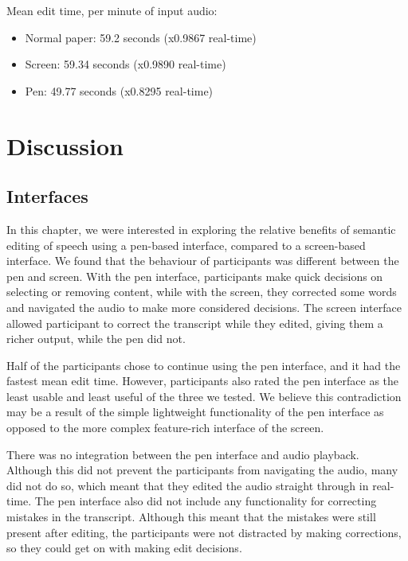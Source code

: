 Mean edit time, per minute of input audio:
\begin{itemize}
    \item Normal paper: 59.2 seconds (x0.9867 real-time)
    \item Screen: 59.34 seconds (x0.9890 real-time)
    \item Pen: 49.77 seconds (x0.8295 real-time)
\end{itemize}







\section{Discussion}\label{sec:paper-discussion}

\subsection{Interfaces}

In this chapter, we were interested in exploring the relative benefits of semantic editing of speech using a pen-based 
interface, compared to a screen-based interface.
We found that the behaviour of participants was different between the pen and screen. With the pen interface,
participants make
quick decisions on selecting or removing content, while with the screen, they corrected some words and navigated the
audio to make more considered decisions. The screen interface allowed participant to correct the transcript while they
edited, giving them a richer output, while the pen did not.

Half of the participants chose to continue using the pen interface, and it had the fastest mean edit time. However,
participants also rated the pen interface as the least usable and least useful of the three we tested. We believe this
contradiction may be a result of the simple lightweight functionality of the pen interface as opposed to the
more complex feature-rich interface of the screen.

There was no integration between the pen interface and audio playback. Although this did not prevent the participants
from navigating the audio, many did not do so, which meant that they edited the audio straight through in real-time. 
The pen interface also did not include any functionality for correcting mistakes in the transcript. Although this meant
that the mistakes were still present after editing, the participants were not distracted by making corrections, so they
could get on with making edit decisions.

